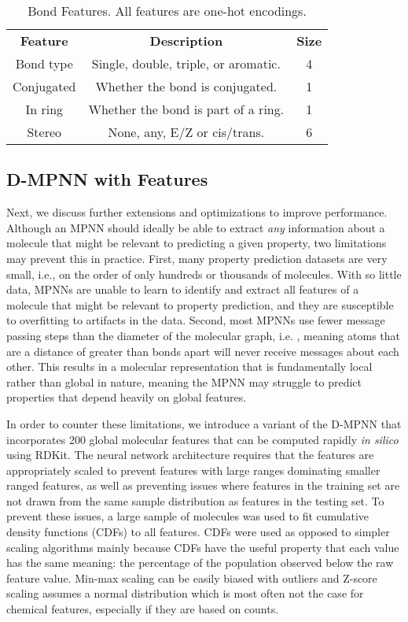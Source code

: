 \documentclass[journal=jcisd8,manuscript=article]{achemso}
\begin{document}
\begin{table}[]
    \centering
    \begin{tabular}{|c|c|c|}
        \hline
        \textbf{Feature} & \textbf{Description} & \textbf{Size} \\
        \Xhline{2\arrayrulewidth}
        Bond type & Single, double, triple, or aromatic. & 4 \\
        Conjugated & Whether the bond is conjugated. & 1 \\
        In ring & Whether the bond is part of a ring. & 1 \\
        Stereo & None, any, E/Z or cis/trans. & 6 \\
        \hline
    \end{tabular}
    \caption{Bond Features. All features are one-hot encodings.}
    \label{tab:bond_features}
\end{table}

\subsection{D-MPNN with Features}

Next, we discuss further extensions and optimizations to improve performance. Although an MPNN should ideally be able to extract \emph{any} information about a molecule that might be relevant to predicting a given property, two limitations may prevent this in practice. First, many property prediction datasets are very small, i.e., on the order of only hundreds or thousands of molecules. With so little data, MPNNs are unable to learn to identify and extract all features of a molecule that might be relevant to property prediction, and they are susceptible to overfitting to artifacts in the data. Second, most MPNNs use fewer message passing steps than the diameter of the molecular graph, i.e. , meaning atoms that are a distance of greater than  bonds apart will never receive messages about each other. This results in a molecular representation that is fundamentally local rather than global in nature, meaning the MPNN may struggle to predict properties that depend heavily on global features. 

In order to counter these limitations, we introduce a variant of the D-MPNN that incorporates 200 global molecular features that can be computed rapidly \textit{in silico} using RDKit. The neural network architecture requires that the features are appropriately scaled to prevent features with large ranges dominating smaller ranged features, as well as preventing issues where features in the training set are not drawn from the same sample distribution as features in the testing set. To prevent these issues, a large sample of molecules was used to fit cumulative density functions (CDFs) to all features. CDFs were used as opposed to simpler scaling algorithms mainly because CDFs have the useful property that each value has the same meaning: the percentage of the population observed below the raw feature value. Min-max scaling can be easily biased with outliers and Z-score scaling assumes a normal distribution which is most often not the case for chemical features, especially if they are based on counts.
\end{document}
